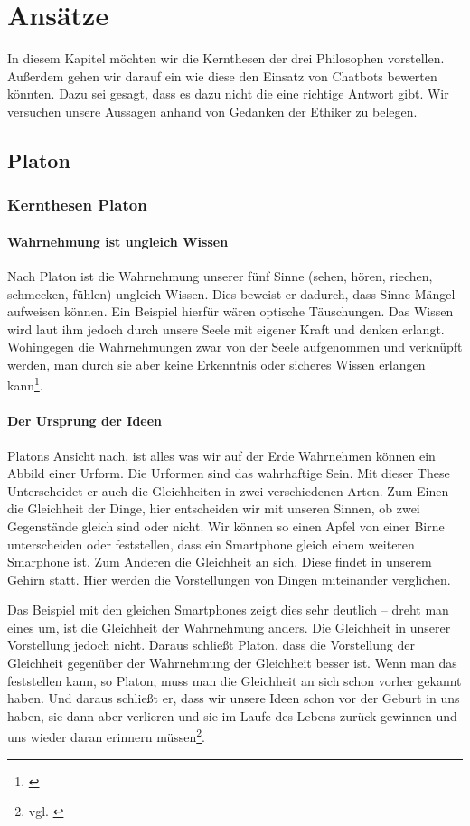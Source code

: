 \section{Ansätze}
In diesem Kapitel möchten wir die Kernthesen der drei Philosophen vorstellen. Außerdem gehen wir darauf ein wie diese den Einsatz von Chatbots bewerten könnten. Dazu sei gesagt, dass es dazu nicht die eine richtige Antwort gibt. Wir versuchen unsere Aussagen anhand von Gedanken der Ethiker zu belegen. 

\subsection{Platon}

\subsubsection{Kernthesen Platon}

\paragraph{Wahrnehmung ist ungleich Wissen} 
Nach Platon ist die Wahrnehmung unserer fünf Sinne (sehen, hören, riechen, schmecken, fühlen) ungleich Wissen. Dies beweist er dadurch, dass Sinne Mängel aufweisen können. Ein Beispiel hierfür wären optische Täuschungen. Das Wissen wird laut ihm jedoch durch unsere Seele mit eigener Kraft und denken erlangt. Wohingegen die Wahrnehmungen zwar von der Seele aufgenommen und verknüpft werden, man durch sie aber keine Erkenntnis oder sicheres Wissen erlangen kann\footnote{\cite{Platon5}}.

\paragraph{Der Ursprung der Ideen}
Platons Ansicht nach, ist alles was wir auf der Erde Wahrnehmen können ein Abbild einer Urform. Die Urformen sind das wahrhaftige Sein. Mit dieser These Unterscheidet er auch die Gleichheiten in zwei verschiedenen Arten.
Zum Einen die Gleichheit der Dinge, hier entscheiden wir mit unseren Sinnen, ob zwei Gegenstände gleich sind oder nicht. Wir können so einen Apfel von einer Birne unterscheiden oder feststellen, dass ein Smartphone gleich einem weiteren Smarphone ist.
Zum Anderen die Gleichheit an sich. Diese findet in unserem Gehirn statt. 
Hier werden die Vorstellungen von Dingen miteinander verglichen.

Das Beispiel mit den gleichen Smartphones zeigt dies sehr deutlich -- dreht man eines um, ist die Gleichheit der Wahrnehmung anders. Die Gleichheit in unserer Vorstellung jedoch nicht. Daraus schließt Platon, dass die Vorstellung der Gleichheit gegenüber der Wahrnehmung der Gleichheit besser ist. Wenn man das feststellen kann, so Platon, muss man die Gleichheit an sich schon vorher gekannt haben. Und daraus schließt er, dass wir unsere Ideen schon vor der Geburt in uns haben, sie dann aber verlieren und sie im Laufe des Lebens zurück gewinnen und uns wieder daran erinnern müssen\footnote{vgl. \cite{Platon3}}.

